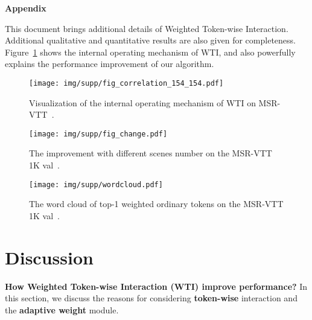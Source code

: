 \documentclass[runningheads]{llncs}
\begin{document}

\noindent\textbf{Appendix}

This document brings additional details of Weighted Token-wise Interaction. 
Additional qualitative and quantitative results are also given for completeness.
Figure~\ref{fig:vis} shows the internal operating mechanism of WTI, and also powerfully explains the performance improvement of our algorithm.

\begin{figure}[H]
\centering
\texttt{[image: img/supp/fig\_correlation\_154\_154.pdf]}
\caption{Visualization of the internal operating mechanism of WTI on MSR-VTT~\cite{msrvtt}.}
\label{fig:vis}
\end{figure}



\begin{figure}[t]
\centering
\texttt{[image: img/supp/fig\_change.pdf]}
\vspace{-6mm}
\caption{The improvement with different scenes number on the MSR-VTT 1K val~\cite{msrvtt}.}
\label{fig:scene}
\end{figure}
\begin{figure}[t]
\centering
\texttt{[image: img/supp/wordcloud.pdf]}
\vspace{-6mm}
\caption{The word cloud of top-1 weighted ordinary tokens on the MSR-VTT 1K val~\cite{msrvtt}.}
\label{fig:word}
\end{figure}

\section{Discussion}
\textbf{How Weighted Token-wise Interaction (WTI) improve performance?} 
In this section, we discuss the reasons for considering \textbf{token-wise} interaction and the \textbf{adaptive weight} module. 
\end{document}
